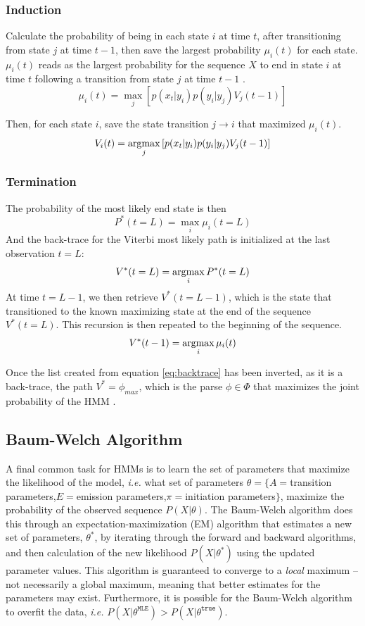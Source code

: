 \subsubsection{Induction}
Calculate the probability of being in each state $i$ at time $t$, after transitioning from state $j$ at time $t-1$, then save the largest probability $\mu_i(t)$ for each state. $\mu_i(t)$ reads as the largest probability for the sequence $X$ to end in state $i$ at time $t$ following a transition from state $j$ at time $t-1$ \cite{Rabiner1989ARecognition}. 
\begin{equation}
    \mu_i(t) =\max_j\left[p(x_t|y_i)p(y_i|y_j)V_j(t-1)\right]
\label{eq:fwdinduc}
\end{equation}

Then, for each state $i$, save the state transition $j\rightarrow i$ that maximized $\mu_i(t)$.  
$$V_i(t) =\operatorname*{argmax}_j\left[p(x_t|y_i)p(y_i|y_j)V_j(t-1)\right]$$

\subsubsection{Termination}
The probability of the most likely end state is then
\begin{equation}
    P^*(t=L) = \max_i{\mu_i(t=L)}
\label{eq:fwdterm}
\end{equation}
And the back-trace for the Viterbi most likely path is initialized at the last observation $t=L$:
$$V^*(t=L) = \operatorname*{argmax}_i{P^*(t=L)}$$
At time $t=L-1$, we then retrieve $V^*(t=L-1)$, which is the state that transitioned to the known maximizing state at the end of the sequence $V^*(t=L)$. This recursion is then repeated to the beginning of the sequence.
\begin{equation}
V^*(t-1) = \operatorname*{argmax}_i{\mu_i(t)}
\label{eq:backtrace}    
\end{equation}

Once the list created from equation \ref{eq:backtrace} has been inverted, as it is a back-trace, the path $V^* = \phi_{max}$, which is the parse $\phi \in \Phi$ that maximizes the joint probability of the HMM \cite{Rabiner1989ARecognition}.

\subsection{Baum-Welch Algorithm}
A final common task for HMMs is to learn the set of parameters that maximize the likelihood of the model, \textit{i.e.} what set of parameters $\theta = \{A=$transition parameters,$E=$emission parameters,$\pi=$initiation parameters$\}$, maximize the probability of the observed sequence $P(X|\theta)$. The Baum-Welch algorithm does this through an expectation-maximization (EM) algorithm that estimates a new set of parameters, $\theta^*$, by iterating through the forward and backward algorithms, and then calculation of the new likelihood $P(X|\theta^*)$ using the updated parameter values. This algorithm is guaranteed to converge to a \textit{local} maximum -- not necessarily a global maximum, meaning that better estimates for the parameters may exist. Furthermore, it is possible for the Baum-Welch algorithm to overfit the data, \textit{i.e.} $P(X|\theta^{\texttt{MLE}}) > P(X|\theta^{\texttt{true}})$. 

